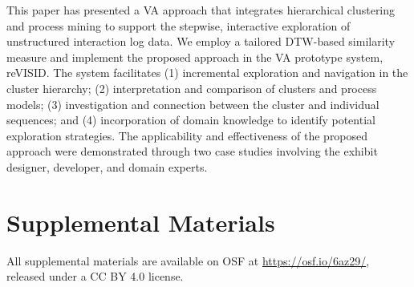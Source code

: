 \documentclass[preprint,journal]{vgtc}            %
\begin{document}
This paper has presented a VA approach that integrates hierarchical clustering and process mining to support the stepwise, interactive exploration of unstructured interaction log data. 
We employ a tailored DTW-based similarity measure and implement the proposed approach in the VA prototype system, reVISID.
The system facilitates (1) incremental exploration and navigation in the cluster hierarchy; (2) interpretation and comparison of clusters and process models; (3) investigation and connection between the cluster and individual sequences; and (4) incorporation of domain knowledge to identify potential exploration strategies.
The applicability and effectiveness of the proposed approach were demonstrated through two case studies involving the exhibit designer, developer, and domain experts.









\section*{Supplemental Materials}
\label{sec:supplemental_materials}

All supplemental materials are available on OSF at \url{https://osf.io/6az29/}, released under a CC BY 4.0 license.






%
%
%




\appendix %
\end{document}

